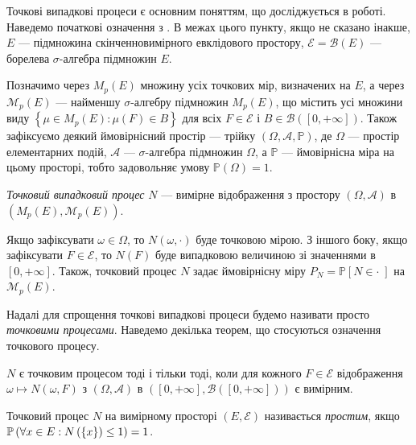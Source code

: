 Точкові випадкові процеси є основним поняттям, що досліджується в роботі.
Наведемо початкові означення з \cite{Resnick_1987}.
В межах цього пункту, якщо не сказано інакше,
$E$ --- підмножина скінченновимірного евклідового простору,
$\mathcal{E} = \mathcal{B}(E)$ --- борелева $\sigma$-алгебра підмножин $E$.

Позначимо через $M_p(E)$ множину усіх точкових мір, визначених на $E$,
а через $\mathcal{M}_p(E)$ --- найменшу $\sigma$-алгебру
підмножин $M_p(E)$, що містить усі множини виду
$\left\{
    \mu \in M_p(E) : \mu(F) \in B
\right\}$ для всіх $F \in \mathcal{E}$ і $B \in \mathcal{B}\left([0, +\infty]\right)$.
Також зафіксуємо деякий ймовірнісний простір --- трійку
$\left(\Omega, \mathcal{A}, \mathbb{P}\right)$, де
$\Omega$ --- простір елементарних подій, $\mathcal{A}$ ---
$\sigma$-алгебра підмножин $\Omega$, а $\mathbb{P}$ --- ймовірнісна міра на цьому просторі,
тобто задовольняє умову $\mathbb{P}\left(\Omega\right) = 1$.
\begin{definition} 
    \emph{Точковий випадковий процес} $N$ --- вимірне відображення
    з простору $\left(\Omega, \mathcal{A}\right)$
    в $\left(M_p(E), \mathcal{M}_p(E)\right)$.
\end{definition}
Якщо зафіксувати $\omega \in \Omega$, то $N(\omega, \cdot)$
буде точковою мірою. З іншого боку, якщо зафіксувати $F \in \mathcal{E}$,
то $N(F)$ буде випадковою величиною зі значеннями в $[0, +\infty]$.
Також, точковий процес $N$ задає ймовірнісну міру 
$P_N = \mathbb{P}\left[N \in \cdot \; \right]$
на $\mathcal{M}_p(E)$.

Надалі для спрощення точкові випадкові процеси
будемо називати просто \emph{точковими процесами}. Наведемо
декілька теорем, що стосуються означення точкового процесу.

\begin{theorem}
    $N$ є точковим процесом тоді і тільки тоді, коли для кожного
    $F \in \mathcal{E}$
    відображення $\omega \mapsto N(\omega, F)$
    з $\left(\Omega, \mathcal{A}\right)$
    в $\left([0, +\infty], \mathcal{B}([0, +\infty])\right)$
    є вимірним.
\end{theorem}

\begin{definition}
    Точковий процес $N$ на вимірному просторі
    $\left(E, \mathcal{E}\right)$ називається \emph{простим}, якщо
    $\P{\forall x \in E : N\left(\{ x \}\right) \leq 1} = 1$. 
\end{definition}

